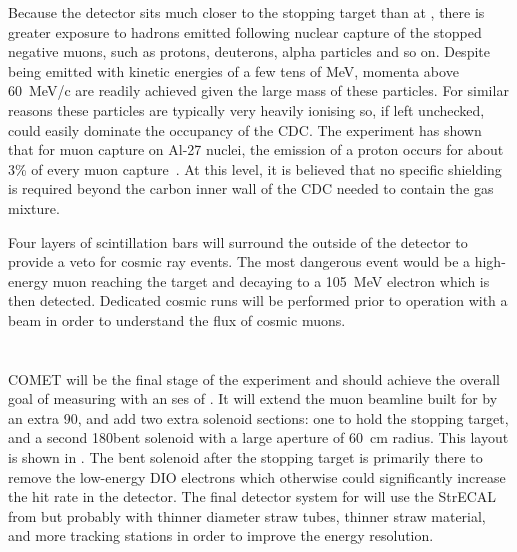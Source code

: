 Because the \phaseI detector sits much closer to the stopping target than at \phaseII, there is greater exposure to hadrons emitted following nuclear capture of the stopped negative muons, such as protons, deuterons, alpha particles and so on.
Despite being emitted with kinetic energies of a few tens of MeV, momenta above 60~MeV/c are readily achieved given the large mass of these particles.
For similar reasons these particles are typically very heavily ionising so, if left unchecked, could easily dominate the occupancy of the \ac{CDC}.
The \alcap experiment has shown that for muon capture on Al-27 nuclei, the emission of a proton occurs for about 3\% of every muon capture~\cite{NamThesis}.
At this level, it is believed that no specific shielding is required beyond the carbon inner wall of the \ac{CDC} needed to contain the gas mixture.
\FigPhaseI

Four layers of scintillation bars will surround the outside of the detector to provide a veto for cosmic ray events.
The most dangerous event would be a high-energy muon reaching the target and decaying to a 105~MeV electron which is then detected. 
Dedicated cosmic runs will be performed prior to operation with a beam in order to understand the flux of cosmic muons.

\section{\COMET \phaseII}
\FigPhaseII

COMET \phaseII will be the final stage of the experiment and should achieve the overall goal of measuring \mueconv with an \ac{ses} of \sensePII.
It will extend the muon beamline built for \phaseI by an extra 90\degree, and add two extra solenoid sections: one to hold the stopping target, and a second 180\degree bent solenoid with a large aperture of 60~cm radius.
This layout is shown in .
The bent solenoid after the stopping target is primarily there to remove the low-energy \ac{DIO} electrons which otherwise could significantly increase the hit rate in the detector.
The final detector system for \phaseII will use the \ac{StrECAL} from \phaseI but probably with thinner diameter straw tubes, thinner straw material, and more tracking stations in order to improve the energy resolution.


